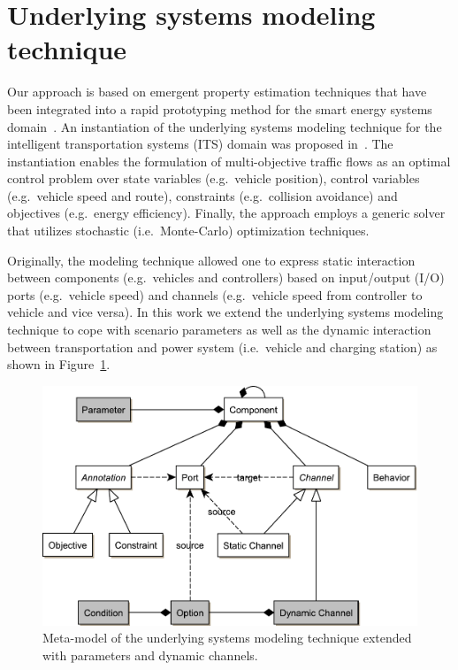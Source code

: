\section{Underlying systems modeling technique}
\label{section:foundation}

Our approach is based on emergent property estimation techniques \cite{hackenberg2012towards} that have been integrated into a rapid prototyping method for the smart energy systems domain~\cite{hackenberg2014rapid}. An instantiation of the underlying systems modeling technique for the intelligent transportation systems (ITS) domain was proposed in~\cite{ascher2014early}. The instantiation enables the formulation of multi-objective traffic flows as an optimal control problem over state variables (e.g.\ vehicle position), control variables (e.g.\ vehicle speed and route), constraints (e.g.\ collision avoidance) and objectives (e.g.\ energy efficiency). Finally, the approach employs a generic solver that utilizes stochastic (i.e.\ Monte-Carlo) optimization techniques.

Originally, the modeling technique allowed one to express static interaction between components (e.g.\ vehicles and controllers) based on input/output (I/O) ports (e.g.\ vehicle speed) and channels (e.g.\ vehicle speed from controller to vehicle and vice versa). In this work we extend the underlying systems modeling technique to cope with scenario parameters as well as the dynamic interaction between transportation and power system (i.e.\ vehicle and charging station) as shown in Figure~\ref{fig:meta_model}.

\begin{figure}[h]
	\centering
	\includegraphics[width=\columnwidth]{../gfx/meta_model.pdf}
	\caption{Meta-model of the underlying systems modeling technique extended with parameters and dynamic channels.}
	\label{fig:meta_model}
\end{figure}

